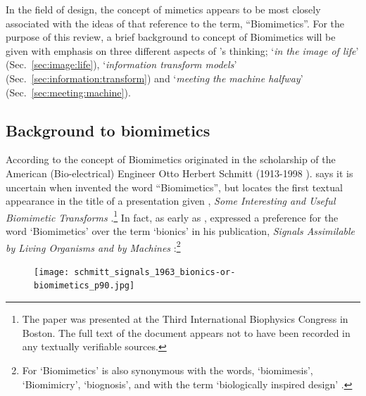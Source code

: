 In the field of design, the concept of mimetics appears to be most closely associated with the ideas of \citeauthor{schmitt_biomimetic_1973} that reference to the term, ``Biomimetics''. For the purpose of this review, a brief background to \citeauthor{schmitt_biomimetic_1973} concept of Biomimetics will be given with emphasis on three different aspects of \citeauthor{schmitt_biomimetic_1973}'s thinking; `\textit{in the image of life}' (Sec.~\ref{sec:image:life}), `\textit{information transform models}' (Sec.~\ref{sec:information:transform}) and  `\textit{meeting the machine halfway}' (Sec.~\ref{sec:meeting:machine}). 

\subsection{Background to biomimetics}
\label{sec:biomimetics:background}

According to \citet{harkness_appreciation_2002} the concept of Biomimetics originated in the scholarship of the American (Bio-electrical) Engineer Otto Herbert Schmitt (1913-1998 \CE). \citeauthor{harkness_appreciation_2002} says it is uncertain when \citeauthor{schmitt_biomimetic_1973} invented the word ``Biomimetics'', but \citeauthor{harkness_appreciation_2002} locates the first textual appearance in the title of a presentation given \citeauthor{schmitt_biomimetic_1973}, \textit{Some Interesting and Useful Biomimetic Transforms} \cite{schmitt_interesting_1969}.\footnote{The paper was presented at the Third International Biophysics Congress in Boston. The full text of the document appears not to have been recorded in any textually verifiable sources.} In fact, as early as \citeyear{schmitt_signals_1963}, \citeauthor{schmitt_signals_1963} expressed a preference for the word `Biomimetics' over the term `bionics' in his publication, \textit{Signals Assimilable by Living Organisms and by Machines} \cite{schmitt_signals_1963}:\footnote{For \citeauthor{vincent_biomimetics_2006} `Biomimetics' is also synonymous with the words, `biomimesis', `Biomimicry', `biognosis', and with the term `biologically inspired design' \cite[p.~471]{vincent_biomimetics_2006}.}

\begin{figure}[H]
    \centering
    \texttt{[image: schmitt\_signals\_1963\_bionics-or-biomimetics\_p90.jpg]}
    \caption{\cite[p.~90]{schmitt_signals_1963}}
    \label{fig:schmitt:bionics}
\end{figure}

